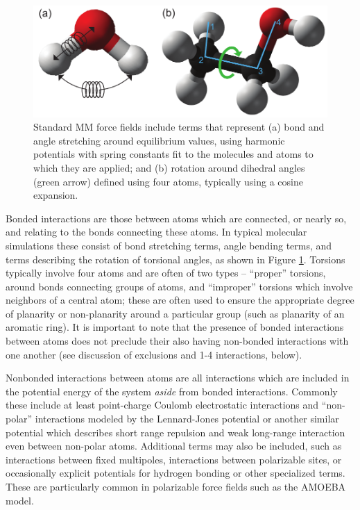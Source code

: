 \documentclass[9pt,bestpractices]{livecoms}
\begin{document}
\begin{figure}[h]
\centering
\includegraphics[width=\linewidth]{potentials_basic_horiz.pdf}
\caption{Standard MM force fields include terms that represent (a) bond and angle stretching around equilibrium values, using harmonic potentials with spring constants fit to the molecules and atoms to which they are applied; and (b) rotation around dihedral angles (green arrow) defined using four atoms, typically using a cosine expansion.}
\label{potentials}
\end{figure}

Bonded interactions are those between atoms which are connected, or nearly so, and relating to the bonds connecting these atoms.
In typical molecular simulations these consist of bond stretching terms, angle bending terms, and terms describing the rotation of torsional angles, as shown in Figure \ref{potentials}.
Torsions typically involve four atoms and are often of two types -- ``proper'' torsions, around bonds connecting groups of atoms, and ``improper''
torsions which involve neighbors of a central atom; these are often used to ensure the appropriate degree of planarity or non-planarity around a particular group (such as planarity of an aromatic ring).
It is important to note that the presence of bonded interactions between atoms does not preclude their also having non-bonded interactions with one another (see discussion of exclusions and 1-4 interactions, below).

Nonbonded interactions between atoms are all interactions which are included in the potential energy of the system \emph{aside} from bonded interactions.
Commonly these include at least point-charge Coulomb electrostatic interactions and ``non-polar'' interactions modeled by the Lennard-Jones potential or another similar potential which describes short range repulsion and weak long-range interaction even between non-polar atoms.
Additional terms may also be included, such as interactions between fixed multipoles, interactions between polarizable sites, or occasionally explicit potentials for hydrogen bonding or other specialized terms.
These are particularly common in polarizable force fields such as the AMOEBA model.
\end{document}
